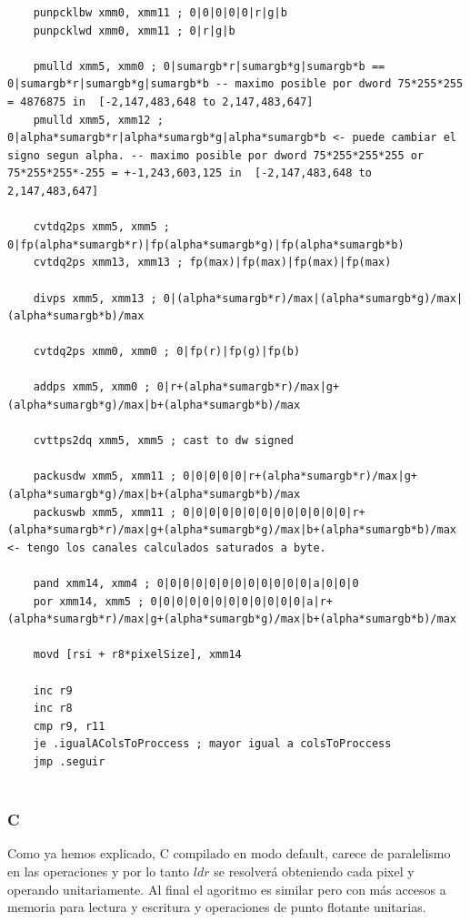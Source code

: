 \begin{codesnippet}
\begin{verbatim}
	punpcklbw xmm0, xmm11 ; 0|0|0|0|0|r|g|b
	punpcklwd xmm0, xmm11 ; 0|r|g|b

	pmulld xmm5, xmm0 ; 0|sumargb*r|sumargb*g|sumargb*b == 0|sumargb*r|sumargb*g|sumargb*b -- maximo posible por dword 75*255*255 = 4876875 in  [-2,147,483,648 to 2,147,483,647]
	pmulld xmm5, xmm12 ; 0|alpha*sumargb*r|alpha*sumargb*g|alpha*sumargb*b <- puede cambiar el signo segun alpha. -- maximo posible por dword 75*255*255*255 or 75*255*255*-255 = +-1,243,603,125 in  [-2,147,483,648 to 2,147,483,647]

    cvtdq2ps xmm5, xmm5 ; 0|fp(alpha*sumargb*r)|fp(alpha*sumargb*g)|fp(alpha*sumargb*b)
	cvtdq2ps xmm13, xmm13 ; fp(max)|fp(max)|fp(max)|fp(max)

	divps xmm5, xmm13 ; 0|(alpha*sumargb*r)/max|(alpha*sumargb*g)/max|(alpha*sumargb*b)/max

	cvtdq2ps xmm0, xmm0 ; 0|fp(r)|fp(g)|fp(b)

	addps xmm5, xmm0 ; 0|r+(alpha*sumargb*r)/max|g+(alpha*sumargb*g)/max|b+(alpha*sumargb*b)/max

	cvttps2dq xmm5, xmm5 ; cast to dw signed 

	packusdw xmm5, xmm11 ; 0|0|0|0|0|r+(alpha*sumargb*r)/max|g+(alpha*sumargb*g)/max|b+(alpha*sumargb*b)/max
	packuswb xmm5, xmm11 ; 0|0|0|0|0|0|0|0|0|0|0|0|0|r+(alpha*sumargb*r)/max|g+(alpha*sumargb*g)/max|b+(alpha*sumargb*b)/max <- tengo los canales calculados saturados a byte.

	pand xmm14, xmm4 ; 0|0|0|0|0|0|0|0|0|0|0|0|a|0|0|0
	por xmm14, xmm5 ; 0|0|0|0|0|0|0|0|0|0|0|0|a|r+(alpha*sumargb*r)/max|g+(alpha*sumargb*g)/max|b+(alpha*sumargb*b)/max

    movd [rsi + r8*pixelSize], xmm14

	inc r9
	inc r8
	cmp r9, r11
	je .igualAColsToProccess ; mayor igual a colsToProccess
	jmp .seguir
    
\end{verbatim}

\end{codesnippet}

\subsubsection{C}

Como ya hemos explicado, C compilado en modo default, carece de paralelismo en las operaciones y por lo tanto $ldr$ se resolverá obteniendo cada pixel y operando unitariamente. Al final el agoritmo es similar pero con más accesos a memoria para lectura y escritura y operaciones de punto flotante unitarias.

